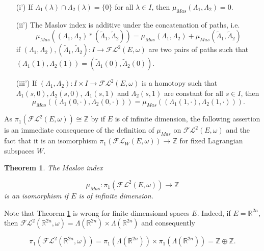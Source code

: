 \documentclass[a4paper,10pt]{article}
\newtheorem{theorem}{Theorem}[section]
\begin{document}
\begin{enumerate}
\item[(i')] If $\Lambda_1(\lambda)\cap \Lambda_2(\lambda)=\{0\}$ for all $\lambda\in I$, then $\mu_{Mas}(\Lambda_1,\Lambda_2)=0$.
\item[(ii')] The Maslov index is additive under the concatenation of paths, i.e.
\[\mu_{Mas}((\Lambda_1,\Lambda_2)\ast(\tilde{\Lambda}_1,\tilde{\Lambda}_2))=\mu_{Mas}(\Lambda_1,\Lambda_2)+\mu_{Mas}(\tilde{\Lambda}_1,\tilde{\Lambda}_2)\]
if $(\Lambda_1,\Lambda_2),(\tilde{\Lambda}_1,\tilde{\Lambda}_2):I\rightarrow\mathcal{FL}^2(E,\omega)$ are two pairs of paths such that $(\Lambda_1(1),\Lambda_2(1))=(\tilde{\Lambda}_1(0),\tilde{\Lambda}_2(0))$.
\item[(iii')] If $(\Lambda_1,\Lambda_2):I\times I\rightarrow\mathcal{FL}^2(E,\omega)$ is a homotopy such that $\Lambda_1(s,0),\Lambda_2(s,0)$, $\Lambda_1(s,1)$ and $\Lambda_2(s,1)$ are constant for all $s\in I$, then
\[\mu_{Mas}((\Lambda_1(0,\cdot),\Lambda_2(0,\cdot)))=\mu_{Mas}((\Lambda_1(1,\cdot),\Lambda_2(1,\cdot))).\]
\end{enumerate}
As $\pi_1(\mathcal{FL}^2(E,\omega))\cong\mathbb{Z}$ by \cite[Cor. 1.6]{NicolaescuI} if $E$ is of infinite dimension, the following assertion is an immediate consequence of the definition of $\mu_{Mas}$ on $\mathcal{FL}^2(E,\omega)$ and the fact that it is an isomorphism $\pi_1(\mathcal{FL}_W(E,\omega))\rightarrow\mathbb{Z}$ for fixed Lagrangian subspaces $W$.

\begin{theorem}\label{Furutani-iso}
The Maslov index

\[\mu_{Mas}:\pi_1(\mathcal{FL}^2(E,\omega))\rightarrow\mathbb{Z}\]
is an isomorphism if $E$ is of infinite dimension.
\end{theorem} 
\noindent
Note that Theorem \ref{Furutani-iso} is wrong for finite dimensional spaces $E$. Indeed, if $E=\mathbb{R}^{2n}$, then $\mathcal{FL}^2(\mathbb{R}^{2n},\omega)=\Lambda(\mathbb{R}^{2n})\times\Lambda(\mathbb{R}^{2n})$ and consequently 

\[\pi_1(\mathcal{FL}^2(\mathbb{R}^{2n},\omega))=\pi_1(\Lambda(\mathbb{R}^{2n}))\times\pi_1(\Lambda(\mathbb{R}^{2n}))=\mathbb{Z}\oplus\mathbb{Z}.\]


\end{document}
